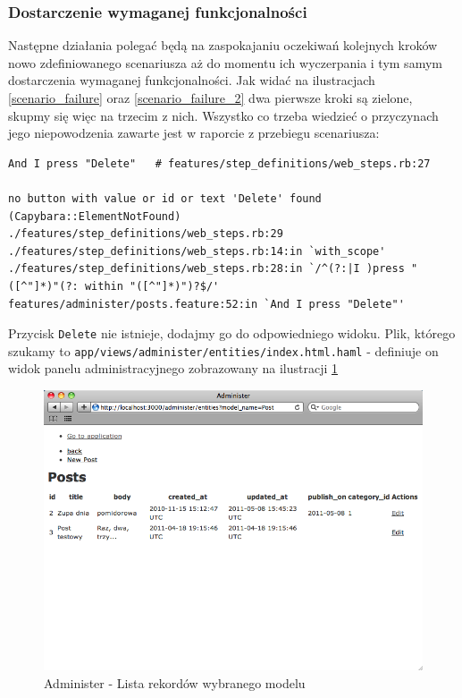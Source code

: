    \subsubsection{Dostarczenie wymaganej funkcjonalności}
   
   Następne działania polegać będą na zaspokajaniu oczekiwań kolejnych kroków nowo zdefiniowanego scenariusza aż do momentu ich wyczerpania i tym samym dostarczenia wymaganej funkcjonalności. Jak widać na ilustracjach \ref{scenario_failure} oraz \ref{scenario_failure_2} dwa pierwsze kroki są zielone, skupmy się więc na trzecim z nich. Wszystko co trzeba wiedzieć o przyczynach jego niepowodzenia zawarte jest w raporcie z przebiegu scenariusza:
   
\begin{lstlisting}
And I press "Delete"   # features/step_definitions/web_steps.rb:27

no button with value or id or text 'Delete' found (Capybara::ElementNotFound)
./features/step_definitions/web_steps.rb:29
./features/step_definitions/web_steps.rb:14:in `with_scope'
./features/step_definitions/web_steps.rb:28:in `/^(?:|I )press "([^"]*)"(?: within "([^"]*)")?$/'
features/administer/posts.feature:52:in `And I press "Delete"'
\end{lstlisting}
   
   Przycisk \texttt{Delete} nie istnieje, dodajmy go do odpowiedniego widoku. Plik, którego szukamy to \texttt{app/views/administer/entities/index.html.haml} - definiuje on widok panelu administracyjnego zobrazowany na ilustracji \ref{administer_index}
   
   \clearpage
   
    \begin{figure}[!h]
  		\begin{center}
  			\includegraphics[width=\linewidth]{images/administer_index.png}
  			\caption{Administer - Lista rekordów wybranego modelu}
  			\label{administer_index}
  		\end{center}
  	\end{figure}
  	
